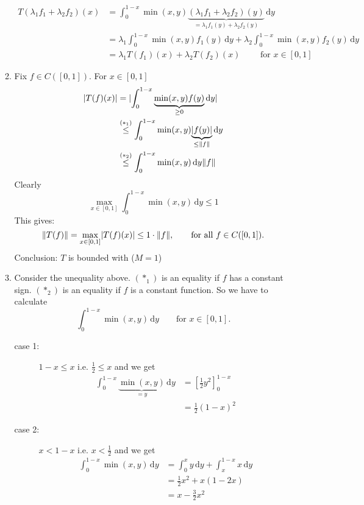 \begin{beispiele}
\begin{enumerate}[(A)]
\begin{beweis}
\begin{enumerate}[(1)]
			\begin{align*}
				T(\lambda_1 f_1 + \lambda_2 f_2)(x) &= \int_{0}^{1-x} \min(x,y)\underset{= \lambda_1 f_1(y)+\lambda_2 f_2(y)}{\underbrace{(\lambda_1 f_1 + \lambda_2 f_2)(y)}} \,\mathrm{d}y \\
				&= \lambda_1 \int_{0}^{1-x}\min(x,y)f_1(y) \,\mathrm{d}y + \lambda_2 \int_{0}^{1-x} \min(x,y)f_2(y) \,\mathrm{d}y \\
				&= \lambda_1 T(f_1)(x) + \lambda_2 T(f_2)(x) \qquad \text{ for }x \in [0,1]
			\end{align*}
			\item Fix $f \in C([0,1])$. For $x \in [0,1]$
			\begin{align*}
				\abs{T(f)(x)} &= \abs{ \int_{0}^{1-x} \underset{\geq 0}{\underbrace{\min(x,y)f(y)}} \,\mathrm{d}y }\\
				&\stackrel{(*_1)}{\leq} \int_{0}^{1-x}\min(x,y)\underset{\leq \norm{f}}{\underbrace{\abs{f(y)}}} \,\mathrm{d}y \\
				&\stackrel{(*_2)}{\leq} \int_{0}^{1-x} \min(x,y) \,\mathrm{d}y \norm{f}
			\end{align*}
			Clearly 
			\[
				\max\limits_{x \in [0,1]}\int_{0}^{1-x} \min(x,y) \,\mathrm{d}y \leq 1
			\]
			This gives:
			\[
				\norm{T(f)} = \max\limits_{x \in [0,1]}\abs{T(f)(x)} \leq 1 \cdot \norm{f}, \qquad \text{for all }f \in C([0,1]).
			\]
			Conclusion: $T$ is bounded with ($M=1$)
			\item Consider the unequality above. $(*_1)$ is an equality if $f$ has a constant sign. $(*_2)$ is an equality if $f$ is a constant function. So we have to calculate 
			\[
				\int_{0}^{1-x} \min(x,y) \,\mathrm{d}y \qquad \text{for }x \in [0,1].
			\]
			\begin{description}
				\item[case 1:]$1-x \leq x$ i.e. $ \frac{1}{2} \leq x$ and we get
				\begin{align*}
					\int_{0}^{1-x} \underset{=y}{\underbrace{\min(x,y)}} \,\mathrm{d}y &= \left[ \frac{1}{2} y^2 \right]_0^{1-x}  \\ &= \frac{1}{2} (1-x)^2
				\end{align*}
				\item[case 2:] $x < 1-x$ i.e. $ x < \frac{1}{2}$ and we get
				\begin{align*}
					\int_{0}^{1-x} \min(x,y) \,\mathrm{d}y &= \int_{0}^{x} y  \,\mathrm{d}y + \int_{x}^{1-x}x \,\mathrm{d}y  \\ &= \frac{1}{2}x^2 + x(1-2x) 
					\\ & = x - \frac{3}{2}x^2

\end{align*}
\end{description}
\end{enumerate}
\end{beweis}
\end{enumerate}
\end{beispiele}
